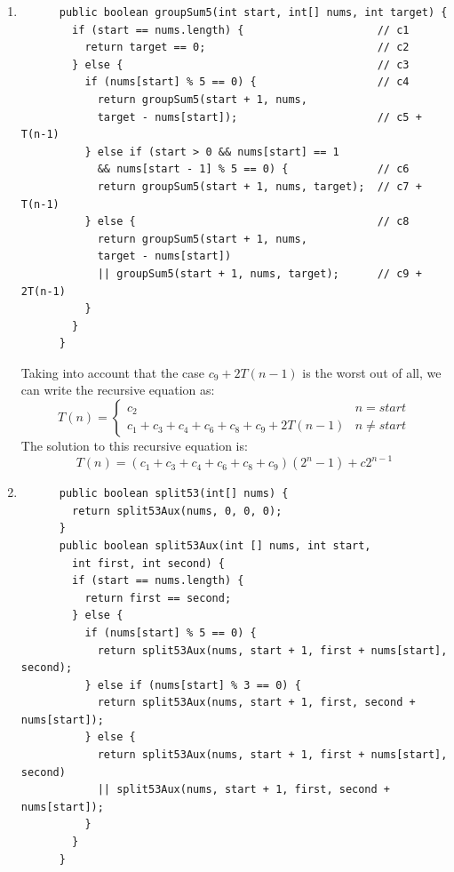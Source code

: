 \documentclass[a4paper,12pt]{article}
\begin{document}
\begin{enumerate}
      \item \begin{Verbatim}
      public boolean groupSum5(int start, int[] nums, int target) {
        if (start == nums.length) {                     // c1
          return target == 0;                           // c2
        } else {                                        // c3
          if (nums[start] % 5 == 0) {                   // c4
            return groupSum5(start + 1, nums,
            target - nums[start]);                      // c5 + T(n-1)
          } else if (start > 0 && nums[start] == 1
            && nums[start - 1] % 5 == 0) {              // c6
            return groupSum5(start + 1, nums, target);  // c7 + T(n-1)
          } else {                                      // c8
            return groupSum5(start + 1, nums,
            target - nums[start])
            || groupSum5(start + 1, nums, target);      // c9 + 2T(n-1)
          }
        }
      }
      \end{Verbatim}
      Taking into account that the case $c_9+2T(n-1)$ is the worst out of all, we can write the recursive equation as:
      \begin{equation*}
        T\left( n \right)=\left\{\begin{array}{cc} c_{2} & n=start \\ c_{1}+c_{3}+c_{4}+c_{6}+c_{8}+c_{9}+2T\left( n-1 \right) & n\neq start\end{array}\right.
      \end{equation*}
      The solution to this recursive equation is:
        \begin{equation*}
T\left( n \right)=\left( c_{1}+c_{3}+c_{4}+c_{6}+c_{8}+c_{9} \right)\left( 2^{n}-1 \right)+c2^{n-1}
        \end{equation*}
      \item \begin{Verbatim}
      public boolean split53(int[] nums) {
        return split53Aux(nums, 0, 0, 0);
      }
      public boolean split53Aux(int [] nums, int start,
        int first, int second) {
        if (start == nums.length) {
          return first == second;
        } else {
          if (nums[start] % 5 == 0) {
            return split53Aux(nums, start + 1, first + nums[start], second);
          } else if (nums[start] % 3 == 0) {
            return split53Aux(nums, start + 1, first, second + nums[start]);
          } else {
            return split53Aux(nums, start + 1, first + nums[start], second)
            || split53Aux(nums, start + 1, first, second + nums[start]);
          }
        }
      }
      \end{Verbatim}
    \end{enumerate}\cite{Wolfram}
\end{document}
